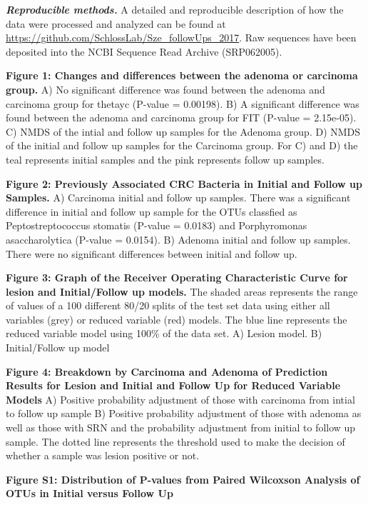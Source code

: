 \documentclass[12pt,]{article}
\begin{document}
\textbf{\emph{Reproducible methods.}} A detailed and reproducible
description of how the data were processed and analyzed can be found at
\url{https://github.com/SchlossLab/Sze_followUps_2017}. Raw sequences
have been deposited into the NCBI Sequence Read Archive (SRP062005).

\newpage

\textbf{Figure 1: Changes and differences between the adenoma or
carcinoma group.} A) No significant difference was found between the
adenoma and carcinoma group for thetayc (P-value = 0.00198). B) A
significant difference was found between the adenoma and carcinoma group
for FIT (P-value = 2.15e-05). C) NMDS of the intial and follow up
samples for the Adenoma group. D) NMDS of the initial and follow up
samples for the Carcinoma group. For C) and D) the teal represents
initial samples and the pink represents follow up samples.

\textbf{Figure 2: Previously Associated CRC Bacteria in Initial and
Follow up Samples.} A) Carcinoma initial and follow up samples. There
was a significant difference in initial and follow up sample for the
OTUs classfied as Peptostreptococcus stomatis (P-value = 0.0183) and
Porphyromonas asaccharolytica (P-value = 0.0154). B) Adenoma initial and
follow up samples. There were no significant differences between initial
and follow up.

\textbf{Figure 3: Graph of the Receiver Operating Characteristic Curve
for lesion and Initial/Follow up models.} The shaded areas represents
the range of values of a 100 different 80/20 splits of the test set data
using either all variables (grey) or reduced variable (red) models. The
blue line represents the reduced variable model using 100\% of the data
set. A) Lesion model. B) Initial/Follow up model

\textbf{Figure 4: Breakdown by Carcinoma and Adenoma of Prediction
Results for Lesion and Initial and Follow Up for Reduced Variable
Models} A) Positive probability adjustment of those with carcinoma from
intial to follow up sample B) Positive probability adjustment of those
with adenoma as well as those with SRN and the probability adjustment
from initial to follow up sample. The dotted line represents the
threshold used to make the decision of whether a sample was lesion
positive or not.

\newpage

\textbf{Figure S1: Distribution of P-values from Paired Wilcoxson
Analysis of OTUs in Initial versus Follow Up}
\end{document}
